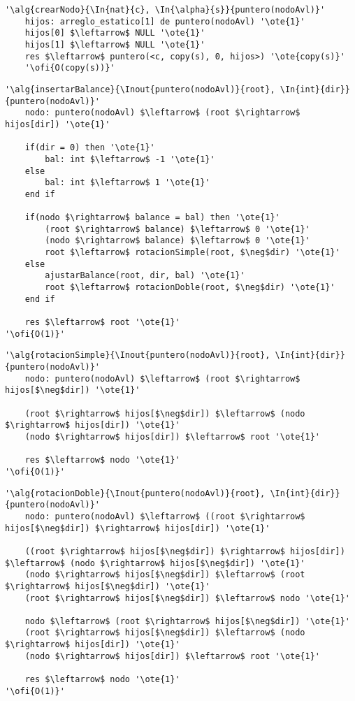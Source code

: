 \begin{lstlisting}[mathescape]
'\alg{crearNodo}{\In{nat}{c}, \In{\alpha}{s}}{puntero(nodoAvl)}'
	hijos: arreglo_estatico[1] de puntero(nodoAvl) '\ote{1}'
	hijos[0] $\leftarrow$ NULL '\ote{1}'
	hijos[1] $\leftarrow$ NULL '\ote{1}'
	res $\leftarrow$ puntero(<c, copy(s), 0, hijos>) '\ote{copy(s)}'
	'\ofi{O(copy(s))}'
\end{lstlisting}

\begin{lstlisting}[mathescape]
'\alg{insertarBalance}{\Inout{puntero(nodoAvl)}{root}, \In{int}{dir}}{puntero(nodoAvl)}'
	nodo: puntero(nodoAvl) $\leftarrow$ (root $\rightarrow$ hijos[dir]) '\ote{1}'

	if(dir = 0) then '\ote{1}'
		bal: int $\leftarrow$ -1 '\ote{1}'
	else
		bal: int $\leftarrow$ 1 '\ote{1}'
	end if

	if(nodo $\rightarrow$ balance = bal) then '\ote{1}'
		(root $\rightarrow$ balance) $\leftarrow$ 0 '\ote{1}'
		(nodo $\rightarrow$ balance) $\leftarrow$ 0 '\ote{1}'
		root $\leftarrow$ rotacionSimple(root, $\neg$dir) '\ote{1}'
	else
		ajustarBalance(root, dir, bal) '\ote{1}'
		root $\leftarrow$ rotacionDoble(root, $\neg$dir) '\ote{1}'
	end if

	res $\leftarrow$ root '\ote{1}'
'\ofi{O(1)}'
\end{lstlisting}

\begin{lstlisting}[mathescape]
'\alg{rotacionSimple}{\Inout{puntero(nodoAvl)}{root}, \In{int}{dir}}{puntero(nodoAvl)}'
	nodo: puntero(nodoAvl) $\leftarrow$ (root $\rightarrow$ hijos[$\neg$dir]) '\ote{1}'

	(root $\rightarrow$ hijos[$\neg$dir]) $\leftarrow$ (nodo $\rightarrow$ hijos[dir]) '\ote{1}'
	(nodo $\rightarrow$ hijos[dir]) $\leftarrow$ root '\ote{1}'

	res $\leftarrow$ nodo '\ote{1}'
'\ofi{O(1)}'
\end{lstlisting}

\begin{lstlisting}[mathescape]
'\alg{rotacionDoble}{\Inout{puntero(nodoAvl)}{root}, \In{int}{dir}}{puntero(nodoAvl)}'
	nodo: puntero(nodoAvl) $\leftarrow$ ((root $\rightarrow$ hijos[$\neg$dir]) $\rightarrow$ hijos[dir]) '\ote{1}'

	((root $\rightarrow$ hijos[$\neg$dir]) $\rightarrow$ hijos[dir]) $\leftarrow$ (nodo $\rightarrow$ hijos[$\neg$dir]) '\ote{1}'
	(nodo $\rightarrow$ hijos[$\neg$dir]) $\leftarrow$ (root $\rightarrow$ hijos[$\neg$dir]) '\ote{1}'
	(root $\rightarrow$ hijos[$\neg$dir]) $\leftarrow$ nodo '\ote{1}'

	nodo $\leftarrow$ (root $\rightarrow$ hijos[$\neg$dir]) '\ote{1}'
	(root $\rightarrow$ hijos[$\neg$dir]) $\leftarrow$ (nodo $\rightarrow$ hijos[dir]) '\ote{1}'
	(nodo $\rightarrow$ hijos[dir]) $\leftarrow$ root '\ote{1}'

	res $\leftarrow$ nodo '\ote{1}'
'\ofi{O(1)}'
\end{lstlisting}

